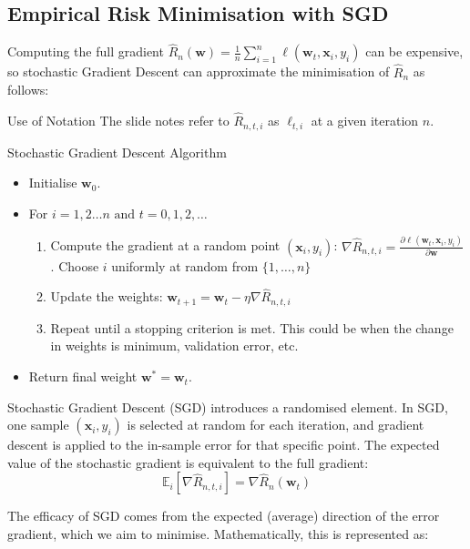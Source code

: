 \subsection*{Empirical Risk Minimisation with SGD}

Computing the full gradient $\widehat{R}_{n}(\mathbf{w})=\frac{1}{n}\sum_{i=1}^{n}\ell(\mathbf{w}_{t},\mathbf{x}_{i},y_{i})$ can be expensive, so stochastic Gradient Descent can approximate the minimisation of \( \hat{R}_n \) as follows:

\begin{commentbox}{Use of Notation}
    The slide notes refer to $\hat{R}_{n,t,i}$ as $\ell_{t,i}$ at a given iteration $n$.
\end{commentbox}

\begin{definitionbox}{Stochastic Gradient Descent Algorithm}
    \begin{itemize}
  \item Initialise \( \mathbf{w}_0 \).
  \item For \( i=1,2\ldots n \text{ and } t = 0,1,2,\ldots \)
  \begin{enumerate}
    \item Compute the gradient at a random point $(\mathbf{x}_i, y_i)$:
    \( \nabla\hat{R}_{n,t,i} = \frac{\partial \ell(\mathbf{w}_t, \mathbf{x}_i, y_i)}{\partial \mathbf{w}} \). Choose $i$ uniformly at random from $\{1,\ldots, n\}$
    \item Update the weights:
    \( \mathbf{w}_{t+1} = \mathbf{w}_t - \eta \nabla\hat{R}_{n,t,i} \)
    \item Repeat until a stopping criterion is met. This could be when the change in weights is minimum, validation error, etc.
  \end{enumerate}
  \item Return final weight \( \mathbf{w}^* = \mathbf{w}_t \).
\end{itemize}

Stochastic Gradient Descent (SGD) introduces a randomised element. In SGD, one sample $(\mathbf{x}_i, y_i)$ is selected at random for each iteration, and gradient descent is applied to the in-sample error for that specific point. The expected value of the stochastic gradient is equivalent to the full gradient:
\[ \mathbb{E}_i[\nabla\hat{R}_{n,t,i}] = \nabla\hat{R}_n(\mathbf{w}_t) \]

\end{definitionbox}
The efficacy of SGD comes from the expected (average) direction of the error gradient, which we aim to minimise. Mathematically, this is represented as:\\

